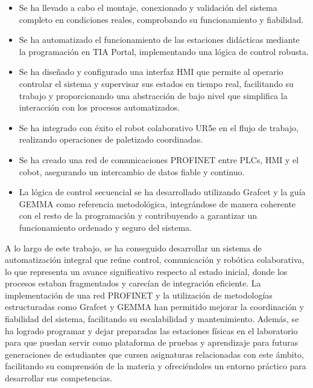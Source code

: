 \begin{itemize}

	 \item Se ha llevado a cabo el montaje, conexionado y validación del sistema completo en condiciones reales, comprobando su funcionamiento y fiabilidad.

	 \item Se ha automatizado el funcionamiento de las estaciones didácticas mediante la programación en TIA Portal, implementando una lógica de control robusta. 
	 
	 \item Se ha diseñado y configurado una interfaz HMI que permite al operario controlar el sistema y supervisar sus estados en tiempo real, facilitando su trabajo y proporcionando una abstracción de bajo nivel que simplifica la interacción con los procesos automatizados.
	 
	 \item Se ha integrado con éxito el robot colaborativo UR5e en el flujo de trabajo, realizando operaciones de paletizado coordinadas.
	 
	 \item Se ha creado una red de comunicaciones PROFINET entre PLCs, HMI y el cobot, asegurando un intercambio de datos fiable y continuo.
	 
	 \item La lógica de control secuencial se ha desarrollado utilizando Grafcet y la guía GEMMA como referencia metodológica, integrándose de manera coherente con el resto de la programación y contribuyendo a garantizar un funcionamiento ordenado y seguro del sistema.
\end{itemize}


A lo largo de este trabajo, se ha conseguido desarrollar un sistema de automatización integral que reúne control, comunicación y robótica colaborativa, lo que representa un avance significativo respecto al estado inicial, donde los procesos estaban fragmentados y carecían de integración eficiente. La implementación de una red PROFINET y la utilización de metodologías estructuradas como Grafcet y GEMMA han permitido mejorar la coordinación y fiabilidad del sistema, facilitando su escalabilidad y mantenimiento. Además, se ha logrado programar y dejar preparadas las estaciones físicas en el laboratorio para que puedan servir como plataforma de pruebas y aprendizaje para futuras generaciones de estudiantes que cursen asignaturas relacionadas con este ámbito, facilitando su comprensión de la materia y ofreciéndoles un entorno práctico para desarrollar sus competencias. 

